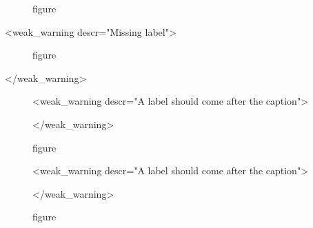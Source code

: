 \documentclass{article}
\begin{document}
    \begin{figure}
        \caption{figure}
        \label{fig:good-label}
    \end{figure}

    <weak_warning descr="Missing label">\begin{figure}
        \caption{figure}
    \end{figure}</weak_warning>

    \begin{figure}
        <weak_warning descr="A label should come after the caption">\label{fig:wrong-label}
        \caption{figure}</weak_warning>
    \end{figure}

    \begin{figure}
        <weak_warning descr="A label should come after the caption">\label{fig:wrong-label2}\caption{figure}</weak_warning>
    \end{figure}
\end{document}
